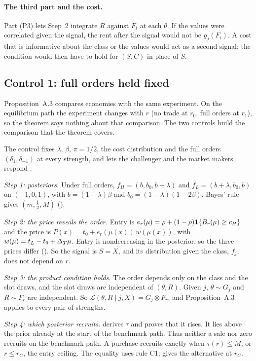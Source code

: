 \paragraph{The third part and the cost.} Part (P3) lets Step~2 integrate \(R\) against \(F_i\) at each \(\theta\). If
the values were correlated given the signal, the rent after the signal would not be \(g_j(F_i)\). A cost that is
informative about the class or the values would act as a second signal; the condition would then have to hold for
\((S,C)\) in place of \(S\).

\subsection{Control 1: full orders held fixed}\label{sec:07_controls-frozen}

Proposition~A.3 compares economies with the same experiment. On the equilibrium path the experiment changes with
\(r\) (no trade at \(r_0\), full orders at \(r_1\)), so the theorem says nothing about that comparison. The two
controls build the comparison that the theorem covers.

The control fixes \(\lambda\), \(\beta\), \(\pi=1/2\), the cost distribution and the full orders \((\delta_1,\delta_{-1})\) at
every strength, and lets the challenger and the market makers respond .

\emph{Step 1: posteriors.} Under full orders, \(f_H=(b,b_0,b+\lambda)\) and \(f_L=(b+\lambda,b_0,b)\) on \((-1,0,1)\),
with \(b=(1-\lambda)\beta\) and \(b_0=(1-\lambda)(1-2\beta)\). Bayes' rule gives \((m,\tfrac12,M)\)
().

\emph{Step 2: the price reveals the order.} Entry is \(e_r(\mu)=\rho+(1-\rho)\mathbf{1}\{B_r(\mu)\ge c_H\}\) and the price is
\(P(x)=t_0+e_r(\mu(x))\,w(\mu(x))\), with \(w(\mu)=t_L-t_0+\Delta_T\mu\). Entry is nondecreasing in the posterior, so the
three prices differ (). So the signal is \(S=X\), and its distribution given the class, \(f_j\),
does not depend on \(r\).

\emph{Step 3: the product condition holds.} The order depends only on the class and the slot draws, and the slot
draws are independent of \((\theta,R)\). Given \(j\), \(\theta\sim G_j\) and \(R\sim F_r\) are independent. So
\(\mathcal L(\theta,R\mid j,X)=G_j\otimes F_r\), and Proposition~A.3 applies to every pair of strengths.

\emph{Step 4: which posterior recruits.}
 derives \(\tau\) and proves that it rises. It lies above the prior already at the
start of the benchmark path. Thus neither a sale nor zero recruits on the benchmark path.
A purchase recruits exactly when \(\tau(r)\le M\), or \(r\le r_C\), the entry ceiling.
The equality uses rule C1;  gives the alternative at \(r_C\).

